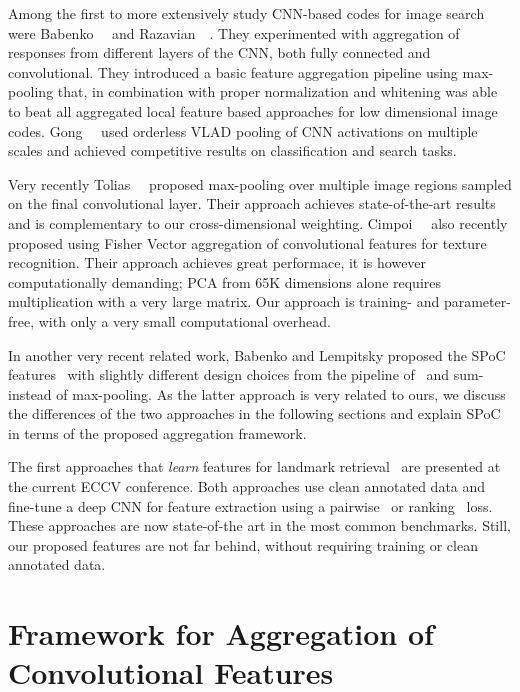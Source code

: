 \documentclass[runningheads]{llncs}
\begin{document}
Among the first to more extensively study CNN-based codes for image search were Babenko~\etal~\cite{BSCL14} and Razavian~\etal~\cite{RASC14, ARS+14}. They experimented with aggregation of responses from different layers of the CNN, both fully connected and convolutional. They introduced a basic feature aggregation pipeline using max-pooling that, in combination with proper normalization and whitening was able to beat all aggregated local feature based approaches for low dimensional image codes. Gong~\etal~\cite{GWGL14} used orderless VLAD pooling of CNN activations on multiple scales and achieved competitive results on classification and search tasks.

Very recently Tolias~\etal~\cite{ToSJ15} proposed max-pooling over multiple image regions sampled on the final convolutional layer. Their approach achieves state-of-the-art results and is complementary to our cross-dimensional weighting.
Cimpoi~\etal~\cite{CiMV15} also recently proposed using Fisher Vector aggregation of convolutional features for texture recognition. Their approach achieves great performace, it is however computationally demanding; PCA from 65K dimensions alone requires multiplication with a very large matrix. Our approach is training- and parameter- free, with only a very small computational overhead.

In another very recent related work, Babenko and Lempitsky proposed the SPoC features~\cite{BaLe15} with slightly different design choices from the pipeline of~\cite{BSCL14} and sum- instead of max-pooling. As the latter approach is very related to ours, we discuss the differences of the two approaches in the following sections and explain SPoC in terms of the proposed aggregation framework. 

The first approaches that \textit{learn} features for landmark retrieval~\cite{RaTC16, GARL16} are presented at the current ECCV conference. Both approaches use clean annotated data and fine-tune a deep CNN for feature extraction using a pairwise~\cite{RaTC16} or ranking~\cite{GARL16} loss. These approaches are now state-of-the art in the most common benchmarks. Still, our proposed features are not far behind, without requiring training or clean annotated data.








 \section{Framework for Aggregation of Convolutional Features}
\label{sec:framework}
\end{document}
